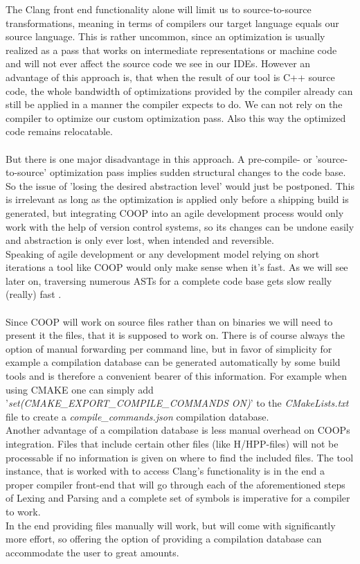 The Clang front end functionality alone will limit us to source-to-source transformations, meaning in terms of compilers our target language equals our source language. This is rather uncommon, since an optimization is usually realized as a pass that works on intermediate representations or machine code and will not ever affect the source code we see in our IDEs. However an advantage of this approach is, that when the result of our tool is C++ source code, the whole bandwidth of optimizations provided by the compiler already can still be applied in a manner the compiler expects to do. We can not rely on the compiler to optimize our custom optimization pass. Also this way the optimized code remains relocatable.\\\\
But there is one major disadvantage in this approach. A pre-compile- or 'source-to-source' optimization pass implies sudden structural changes to the code base. So the issue of 'losing the desired abstraction level' would just be postponed. This is irrelevant as long as the optimization is applied only before a shipping build is generated, but integrating COOP into an agile development process would only work with the help of version control systems, so its changes can be undone easily and abstraction is only ever lost, when intended and reversible.\\
Speaking of agile development or any development model relying on short iterations a tool like COOP would only make sense when it's fast. As we will see later on, traversing numerous ASTs for a complete code base gets slow really (really) fast .\\\\
Since COOP will work on source files rather than on binaries we will need to present it the files, that it is supposed to work on. There is of course always the option of manual forwarding per command line, but in favor of simplicity for example a compilation database can be generated automatically by some build tools and is therefore a convenient bearer of this information. For example when using CMAKE one can simply add '\textit{set(CMAKE\_EXPORT\_COMPILE\_COMMANDS ON)}' to the \textit{CMakeLists.txt} file to create a \textit{compile\_commands.json} compilation database.\\
Another advantage of a compilation database is less manual overhead on COOPs integration. Files that include certain other files (like H/HPP-files) will not be processable if no information is given on where to find the included files. The tool instance, that is worked with to access Clang's functionality is in the end a proper compiler front-end that will go through each of the aforementioned steps of Lexing and Parsing and a complete set of symbols is imperative for a compiler to work.\\
In the end providing files manually will work, but will come with significantly more effort, so offering the option of providing a compilation database can accommodate the user to great amounts.

